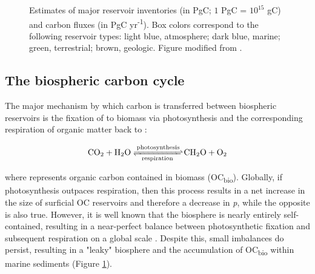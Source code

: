 \begin{figure}[h]
	\caption[Carbon cycle reservoir inventories and fluxes]{Estimates of major reservoir inventories (in PgC; $1$ PgC = $10^{15}$ gC) and carbon fluxes (in PgC yr\textsuperscript{-1}). Box colors correspond to the following reservoir types: light blue, atmosphere; dark blue, marine; green, terrestrial; brown, geologic. Figure modified from \citet{Bianchi:2011cu}.}
	\label{Ch1Fig:1}
\end{figure}

\subsection{The biospheric carbon cycle}

The major mechanism by which carbon is transferred between biospheric reservoirs is the fixation of  to biomass via photosynthesis and the corresponding respiration of organic matter back to :

\begin{equation}\label{Ch1Eq:1}
	\ce{CO2 + H2O <=>[{photosynthesis}][{respiration}] CH2O + O2}
\end{equation}

where  represents organic carbon contained in biomass (OC\textsubscript{bio}). Globally, if photosynthesis outpaces respiration, then this process results in a net increase in the size of surficial OC reservoirs and therefore a decrease in \textit{p}, while the opposite is also true. However, it is well known that the biosphere is nearly entirely self-contained, resulting in a near-perfect balance between photosynthetic  fixation and subsequent respiration on a global scale \citep{Sarmiento:2006wz}. Despite this, small imbalances do persist, resulting in a "leaky" biosphere and the accumulation of OC\textsubscript{bio} within marine sediments (Figure \ref{Ch1Fig:1}).

